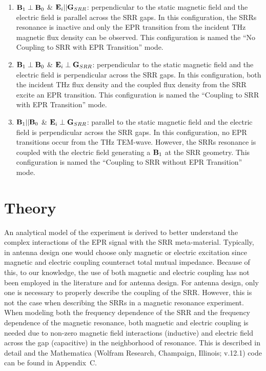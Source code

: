 \begin{enumerate}[label=(\Alph*)]
    \item $\textbf{B}_{1} \perp \textbf{B}_{0}$ \& $\textbf{E}_{i}||\textbf{G}_{SRR}$: perpendicular to the static magnetic field and the electric field is parallel across the SRR gaps. In this configuration, the SRRs resonance is inactive and only the EPR transition from the incident THz magnetic flux density can be observed. This configuration is named the ``No Coupling to SRR with EPR Transition'' mode. 
    \item $\textbf{B}_{1} \perp \textbf{B}_{0}$ \& $\textbf{E}_{i}\perp\textbf{G}_{SRR}$: perpendicular to the static magnetic field and the electric field is perpendicular across the SRR gaps. In this configuration, both the incident THz flux density and the coupled flux density from the SRR excite an EPR transition. This configuration is named the ``Coupling to SRR with EPR Transition'' mode.
    \item $\textbf{B}_{1} || \textbf{B}_{0}$ \& $\textbf{E}_{i}\perp\textbf{G}_{SRR}$: parallel to the static magnetic field and the electric field is perpendicular across the SRR gaps. In this configuration, no EPR transitions occur from the THz TEM-wave. However, the SRRs resonance is coupled with the electric field generating a $\textbf{B}_{1}$ at the SRR geometry. This configuration is named the ``Coupling to SRR without EPR Transition'' mode.
\end{enumerate}


\section{Theory}
An analytical model of the experiment is derived to better understand the complex interactions of the EPR signal with the SRR meta-material. Typically, in antenna design one would choose only magnetic \cite{srrmodel} or electric \cite{Katsarakis04} excitation since magnetic and electric coupling counteract total mutual impedance. Because of this, to our knowledge, the use of both magnetic and electric coupling has not been employed in the literature and for antenna design. For antenna design, only one is necessary to properly describe the coupling of the SRR. \cite{Baena2005,DurnSindreu2012,Bojanic2014,Su2015} However, this is not the case when describing the SRRs in a magnetic resonance experiment. When modeling both the frequency dependence of the SRR and the frequency dependence of the magnetic resonance, both magnetic and electric coupling is needed due to non-zero magnetic field interactions (inductive) and electric field across the gap (capacitive) in the neighborhood of resonance. This is described in detail and the Mathematica (Wolfram Research, Champaign, Illinois; v.12.1) code can be found in Appendix~C.


